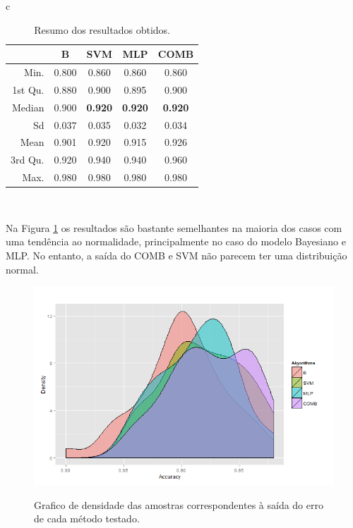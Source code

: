 \documentclass[12pt]{article}
\begin{document}
 
\begin{table}[!h]
\renewcommand{\arraystretch}{1.3}
\caption{Resumo dos resultados obtidos.}
\label{tab:analisis_data}
\centering
\begin{tabular}{c}
\begin{tabular}{rcccc}
\hline
         &B   &     SVM  &  MLP   &  COMB     \\
\hline     
 Min.    &0.800   &0.860   &0.860   &0.860\\  
 1st Qu. &0.880   &0.900   &0.895   &0.900\\  
 Median  &0.900   &\textbf{0.920}   &\textbf{0.920}   &\textbf{0.920}\\  
 Sd      &0.037   &0.035   &0.032   &0.034\\
 Mean    &0.901   &0.920   &0.915   &0.926\\  
 3rd Qu. &0.920   &0.940   &0.940   &0.960\\  
 Max.    &0.980   &0.980   &0.980   &0.980\\  
\hline 
\end{tabular}\\
\end{tabular}
\end{table} 
 
Na Figura \ref{fig:densidade_acc} os resultados são bastante semelhantes na maioria dos casos com uma tendência ao normalidade, principalmente no caso do modelo Bayesiano e MLP. No entanto, a saída do COMB e SVM não parecem ter uma distribuição normal.

\begin{figure}[h]
\centering
\includegraphics[width=4.5in]{../out/density-graph.png} \\
\caption{Grafico de densidade das amostras correspondentes à saída do erro de cada método testado.}
\label{fig:densidade_acc}
\end{figure} 
\end{document}
